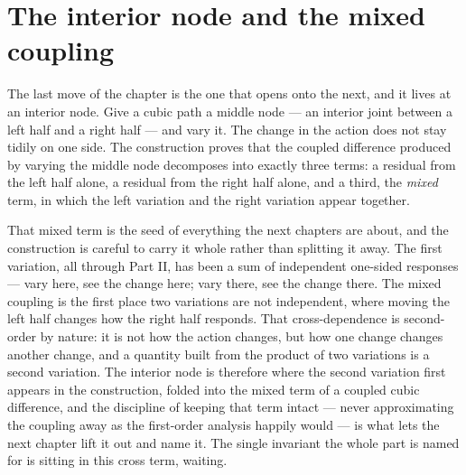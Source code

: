 \section{The interior node and the mixed coupling}
\label{se:the-interior-node-and-the-mixed-coupling}

The last move of the chapter is the one that opens onto the next, and it lives at an interior node. Give
a cubic path a middle node --- an interior joint between a left half and a right half --- and vary it.
The change in the action does not stay tidily on one side. The construction proves that the coupled
difference produced by varying the middle node decomposes into exactly three terms: a residual from the
left half alone, a residual from the right half alone, and a third, the \emph{mixed} term, in which the
left variation and the right variation appear together.

That mixed term is the seed of everything the next chapters are about, and the construction is careful
to carry it whole rather than splitting it away. The first variation, all through Part II, has been a
sum of independent one-sided responses --- vary here, see the change here; vary there, see the change
there. The mixed coupling is the first place two variations are not independent, where moving the left
half changes how the right half responds. That cross-dependence is second-order by nature: it is not
how the action changes, but how one change changes another change, and a quantity built from the
product of two variations is a second variation. The interior node is therefore where the second
variation first appears in the construction, folded into the mixed term of a coupled cubic difference,
and the discipline of keeping that term intact --- never approximating the coupling away as the
first-order analysis happily would --- is what lets the next chapter lift it out and name it. The
single invariant the whole part is named for is sitting in this cross term, waiting.

